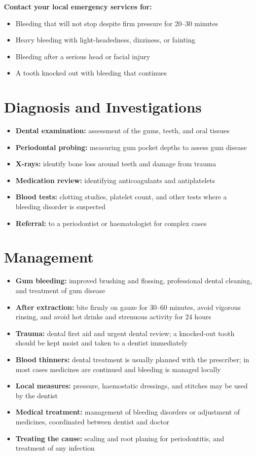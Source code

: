 \textbf{Contact your local emergency services for:}
\begin{itemize}
    \item Bleeding that will not stop despite firm pressure for 20--30 minutes
    \item Heavy bleeding with light-headedness, dizziness, or fainting
    \item Bleeding after a serious head or facial injury
    \item A tooth knocked out with bleeding that continues
\end{itemize}

\section*{Diagnosis and Investigations}
\begin{itemize}
    \item \textbf{Dental examination:} assessment of the gums, teeth, and oral tissues
    \item \textbf{Periodontal probing:} measuring gum pocket depths to assess gum disease
    \item \textbf{X-rays:} identify bone loss around teeth and damage from trauma
    \item \textbf{Medication review:} identifying anticoagulants and antiplatelets
    \item \textbf{Blood tests:} clotting studies, platelet count, and other tests where a bleeding disorder is suspected
    \item \textbf{Referral:} to a periodontist or haematologist for complex cases
\end{itemize}

\section*{Management}
\begin{itemize}
    \item \textbf{Gum bleeding:} improved brushing and flossing, professional dental cleaning, and treatment of gum disease
    \item \textbf{After extraction:} bite firmly on gauze for 30--60 minutes, avoid vigorous rinsing, and avoid hot drinks and strenuous activity for 24 hours
    \item \textbf{Trauma:} dental first aid and urgent dental review; a knocked-out tooth should be kept moist and taken to a dentist immediately
    \item \textbf{Blood thinners:} dental treatment is usually planned with the prescriber; in most cases medicines are continued and bleeding is managed locally
    \item \textbf{Local measures:} pressure, haemostatic dressings, and stitches may be used by the dentist
    \item \textbf{Medical treatment:} management of bleeding disorders or adjustment of medicines, coordinated between dentist and doctor
    \item \textbf{Treating the cause:} scaling and root planing for periodontitis, and treatment of any infection
\end{itemize}

